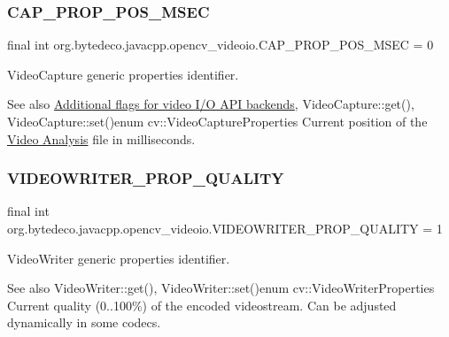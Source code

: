 \subsubsection{\texorpdfstring{C\+A\+P\+\_\+\+P\+R\+O\+P\+\_\+\+P\+O\+S\+\_\+\+M\+S\+EC}{CAP\_PROP\_POS\_MSEC}}
{\footnotesize\ttfamily final int org.\+bytedeco.\+javacpp.\+opencv\+\_\+videoio.\+C\+A\+P\+\_\+\+P\+R\+O\+P\+\_\+\+P\+O\+S\+\_\+\+M\+S\+EC = 0\hspace{0.3cm}{\ttfamily [static]}}



Video\+Capture generic properties identifier. 

\begin{DoxySeeAlso}{See also}
\hyperlink{group__videoio__flags__others}{Additional flags for video I/\+O A\+P\+I backends}, Video\+Capture\+::get(), Video\+Capture\+::set()enum cv\+::\+Video\+Capture\+Properties Current position of the \hyperlink{group__video}{Video Analysis} file in milliseconds. 
\end{DoxySeeAlso}
\mbox{\label{group__videoio__flags__base_gac45c570604a0024fe45239139e0d4e5b}} 
\subsubsection{\texorpdfstring{V\+I\+D\+E\+O\+W\+R\+I\+T\+E\+R\+\_\+\+P\+R\+O\+P\+\_\+\+Q\+U\+A\+L\+I\+TY}{VIDEOWRITER\_PROP\_QUALITY}}
{\footnotesize\ttfamily final int org.\+bytedeco.\+javacpp.\+opencv\+\_\+videoio.\+V\+I\+D\+E\+O\+W\+R\+I\+T\+E\+R\+\_\+\+P\+R\+O\+P\+\_\+\+Q\+U\+A\+L\+I\+TY = 1\hspace{0.3cm}{\ttfamily [static]}}



Video\+Writer generic properties identifier. 

\begin{DoxySeeAlso}{See also}
Video\+Writer\+::get(), Video\+Writer\+::set()enum cv\+::\+Video\+Writer\+Properties Current quality (0..100\%) of the encoded videostream. Can be adjusted dynamically in some codecs. 
\end{DoxySeeAlso}
